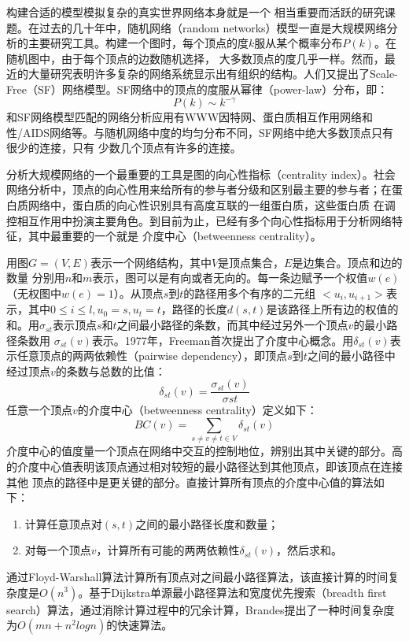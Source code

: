 \begin{flushleft}
构建合适的模型模拟复杂的真实世界网络本身就是一个
相当重要而活跃的研究课题\citep{network-model-nas, network-model-globcomm,network-model-rmat}。在过去的几十年中，随机网络（random
networks）\citep{network-model-nas}模型一直是大规模网络分析的主要研究工具。构建一个图时，每个顶点的度$k$服从某个概率分布$P(k)$。在随机图中，由于每个顶点的边数随机选择，
大多数顶点的度几乎一样。然而，最近的大量研究表明许多复杂的网络系统显示出有组织的结构。人们又提出了Scale-Free（SF）网络模型\citep{network-sf-math,network-sf-phy}。SF网络中的顶点的度服从幂律（power-law）分布\citep{network-power-law}，即：
\begin{equation}\label{eq:power_law}
P(k)\sim k^{-\gamma}
\end{equation}
和SF网络模型匹配的网络分析应用有WWW因特网、蛋白质相互作用网络和性/AIDS网络等。与随机网络中度的均匀分布不同，SF网络中绝大多数顶点只有很少的连接，只有
少数几个顶点有许多的连接。

分析大规模网络的一个最重要的工具是图的向心性指标（centrality
index）\citep{network-centrality}。社会网络分析中，顶点的向心性用来给所有的参与者分级和区别最主要的参与者；在蛋白质网络中，蛋白质的向心性识别具有高度互联的一组蛋白质，这些蛋白质
在调控相互作用中扮演主要角色。到目前为止，已经有多个向心性指标用于分析网络特征，其中最重要的一个就是
介度中心（betweenness centrality）\citep{network-bc}。

用图$G=(V,E)$表示一个网络结构，其中$V$是顶点集合，$E$是边集合。顶点和边的数量
分别用$n$和$m$表示，图可以是有向或者无向的。每一条边赋予一个权值$w(e)$（无权图中$w(e)=1$）。从顶点$s$到$t$的路径用多个有序的二元组
$<u_{i},u_{i+1}>$表示，其中$0\le i\le l, u_{0}=s, u_{t} =
t$，路径的长度$d(s,t)$是该路径上所有边的权值的和。用$\sigma_{st}$表示顶点$s$和$t$之间最小路径的条数，而其中经过另外一个顶点$v$的最小路径条数用
$\sigma_{st}(v)$表示。1977年，Freeman\cite{network-bc}首次提出了介度中心概念。用$\delta_{st}(v)$表示任意顶点的两两依赖性（pairwise
dependency），即顶点$s$到$t$之间的最小路径中经过顶点$v$的条数与总数的比值：
\begin{equation}\label{eq:pairwise_dep}
\delta_{st}(v)=\frac{\sigma_{st}(v)}{\sigma{st}}
\end{equation}
任意一个顶点$v$的介度中心（betweenness centrality）定义如下：
\begin{equation}\label{eq:bet_cent}
BC(v)=\sum_{s\ne v\ne t\in V}\delta_{st}(v)
\end{equation}
介度中心的值度量一个顶点在网络中交互的控制地位，辨别出其中关键的部分。高的介度中心值表明该顶点通过相对较短的最小路径达到其他顶点，即该顶点在连接其他
顶点的路径中是更关键的部分。直接计算所有顶点的介度中心值的算法如下：
\begin{enumerate}
	\item 计算任意顶点对$(s,t)$之间的最小路径长度和数量；
	\item 对每一个顶点$v$，计算所有可能的两两依赖性$\delta_{st}(v)$，然后求和。
\end{enumerate}
通过Floyd-Warshall算法计算所有顶点对之间最小路径算法，该直接计算的时间复杂度是$O(n^{3})$。基于Dijkstra单源最小路径算法和宽度优先搜索（breadth
first search）算法，通过消除计算过程中的冗余计算，Brandes\citep{brandes-bc}提出了一种时间复杂度为$O(mn+n^{2}logn)$的快速算法。


\end{flushleft}
